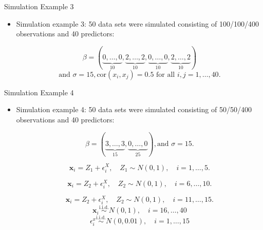     \begin{frame}{Simulation Example 3}
        \begin{itemize}
            \item Simulation example 3: 50 data sets were simulated consisting of 100/100/400 observations and 40 predictors:
            
 $$\beta= ( \underbrace{0, \dots,0}_{10} ,\underbrace{2, \dots, 2}_{10}, \underbrace{0, \dots,0}_{10} ,\underbrace{2, \dots, 2}_{10}) $$ 
 $$ \text{and } \sigma= 15,  \text{cor}( x_i, x_j) = 0.5 \text{ for all }i,j=1,\dots,40.$$
        \end{itemize}
    \end{frame}


    \begin{frame}{Simulation Example 4}
        \begin{itemize}
            \item Simulation example 4: 50 data sets were simulated consisting of 50/50/400 observations and 40 predictors:

$$\beta= ( \underbrace{3, \dots, 3}_{15}, \underbrace{0, \dots, 0}_{25}) , \text{and }\sigma=15.$$

$$\mathbf{x}_{i}=Z_1+\epsilon_i^X,\quad Z_1\sim N(0,1),\quad i=1,\dots,5.$$

$$\mathbf{x}_{i}=Z_2+\epsilon_i^X,\quad Z_2\sim N(0,1),\quad i=6,\dots,10.$$

$$\mathbf{x}_{i}=Z_2+\epsilon_i^X,\quad Z_2\sim N(0,1),\quad i=11,\dots,15.$$
 $$\mathbf{x}_{i}\overset{\mathrm{i.i.d.}}{\operatorname*{\sim}}N(0,1),\quad i=16,\dots,40$$
 $$\epsilon_i^x\stackrel{\mathrm{i.i.d.}}{\sim}N(0,0.01),\quad i=1,\dots,15$$
            
        \end{itemize}
    \end{frame}

